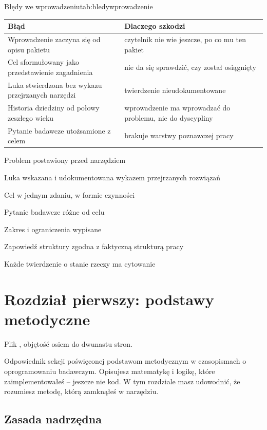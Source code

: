 \begin{tabelaepi}{Błędy we wprowadzeniu}{tab:bledywprowadzenie}
\begin{tabular}{@{}p{6.6cm}p{6.6cm}@{}}
\toprule
Błąd & Dlaczego szkodzi \\
\midrule
Wprowadzenie zaczyna się od opisu pakietu & czytelnik nie wie jeszcze, po co mu ten pakiet \\
Cel sformułowany jako przedstawienie zagadnienia & nie da się sprawdzić, czy został osiągnięty \\
Luka stwierdzona bez wykazu przejrzanych narzędzi & twierdzenie nieudokumentowane \\
Historia dziedziny od połowy zeszłego wieku & wprowadzenie ma wprowadzać do problemu, nie do dyscypliny \\
Pytanie badawcze utożsamione z celem & brakuje warstwy poznawczej pracy \\
\bottomrule
\end{tabular}
\end{tabelaepi}

\begin{kontrolna}
\item Problem postawiony przed narzędziem
\item Luka wskazana i udokumentowana wykazem przejrzanych rozwiązań
\item Cel w jednym zdaniu, w formie czynności
\item Pytanie badawcze różne od celu
\item Zakres i ograniczenia wypisane
\item Zapowiedź struktury zgodna z faktyczną strukturą pracy
\item Każde twierdzenie o stanie rzeczy ma cytowanie
\end{kontrolna}

\section{Rozdział pierwszy: podstawy metodyczne}\label{sec:rozdzial1}

Plik , objętość osiem do dwunastu stron.

Odpowiednik sekcji poświęconej podstawom metodycznym w czasopismach o oprogramowaniu badawczym. Opisujesz matematykę i logikę, które zaimplementowałeś -- jeszcze nie kod. W tym rozdziale masz udowodnić, że rozumiesz metodę, którą zamknąłeś w narzędziu.

\subsection{Zasada nadrzędna}

